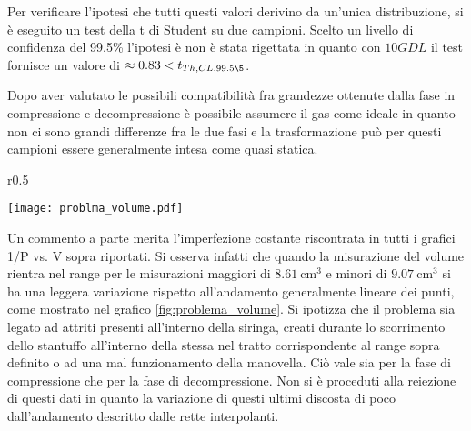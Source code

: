 \documentclass[a4paper,11pt,oneside]{article}
\begin{document}
Per verificare l'ipotesi che tutti questi valori derivino da un'unica distribuzione, si è eseguito un test della t di Student su due campioni. Scelto un livello di confidenza del 99.5\% l'ipotesi è non è stata rigettata in quanto con $10 GDL$ il test fornisce un valore di $\approx 0.83 < t_{Th, CL. 99.5\5}$.\newline

Dopo aver valutato le possibili compatibilità fra grandezze ottenute dalla fase in compressione e decompressione è possibile assumere il gas come ideale in quanto non ci sono grandi differenze fra le due fasi e la trasformazione può per questi campioni essere generalmente intesa come quasi statica. 


\begin{wrapfigure}{r}{0.5\textwidth}
  \begin{center}
    \texttt{[image: problma\_volume.pdf]}
  \end{center}
  \caption{Zoom volume}
  \label{fig:problema_volume}
\end{wrapfigure}
Un commento a parte merita l'imperfezione costante riscontrata in tutti i grafici 1/P vs. V sopra riportati.
Si osserva infatti che quando la misurazione del volume rientra nel range per le misurazioni maggiori di $\SI{8,61}{\centi\meter\cubed}$ e minori di $\SI{9,07}{\centi\meter\cubed}$ si ha una leggera variazione rispetto all'andamento generalmente lineare dei punti, come mostrato nel grafico \ref{fig:problema_volume}. Si ipotizza che il problema sia legato ad attriti presenti all'interno della siringa, creati durante lo scorrimento dello stantuffo all'interno della stessa nel tratto corrispondente al range sopra definito o ad una mal funzionamento della manovella. Ciò vale sia per la fase di compressione che per la fase di decompressione. Non si è proceduti alla reiezione di questi dati in quanto la variazione di questi ultimi discosta di poco dall'andamento descritto dalle rette interpolanti.


\end{document}

